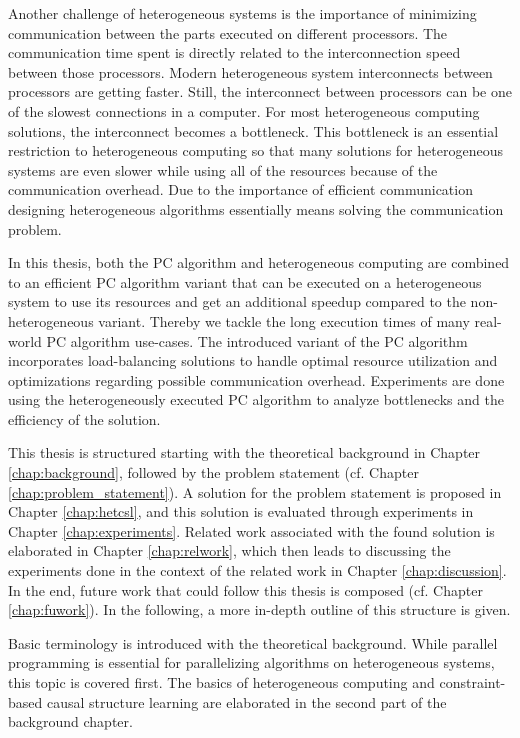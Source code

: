 Another challenge of heterogeneous systems is the importance of minimizing communication between the parts executed on different processors. The communication time spent is directly related to the interconnection speed between those processors. Modern heterogeneous system interconnects between processors are getting faster. Still, the interconnect between processors can be one of the slowest connections in a computer. For most heterogeneous computing solutions, the interconnect becomes a bottleneck. This bottleneck is an essential restriction to heterogeneous computing so that many solutions for heterogeneous systems are even slower while using all of the resources because of the communication overhead. Due to the importance of efficient communication designing heterogeneous algorithms essentially means solving the communication problem.

In this thesis, both the PC algorithm and heterogeneous computing are combined to an efficient PC algorithm variant that can be executed on a heterogeneous system to use its resources and get an additional speedup compared to the non-heterogeneous variant. Thereby we tackle the long execution times of many real-world PC algorithm use-cases. The introduced variant of the PC algorithm incorporates load-balancing solutions to handle optimal resource utilization and optimizations regarding possible communication overhead. Experiments are done using the heterogeneously executed PC algorithm to analyze bottlenecks and the efficiency of the solution.

This thesis is structured starting with the theoretical background in Chapter \ref{chap:background}, followed by the problem statement (cf. Chapter \ref{chap:problem_statement}). A solution for the problem statement is proposed in Chapter \ref{chap:hetcsl}, and this solution is evaluated through experiments in Chapter \ref{chap:experiments}. Related work associated with the found solution is elaborated in Chapter \ref{chap:relwork}, which then leads to discussing the experiments done in the context of the related work in Chapter \ref{chap:discussion}. In the end, future work that could follow this thesis is composed (cf. Chapter \ref{chap:fuwork}). In the following, a more in-depth outline of this structure is given.

Basic terminology is introduced with the theoretical background. While parallel programming is essential for parallelizing algorithms on heterogeneous systems, this topic is covered first. The basics of heterogeneous computing and constraint-based causal structure learning are elaborated in the second part of the background chapter.

